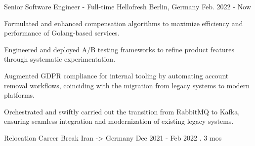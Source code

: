


\begin{cventries}


    \cventry
    {Senior Software Engineer - Full-time} %
    {Hellofresh} %
    {Berlin, Germany} %
    {Feb. 2022 - Now} %
    { %
        \begin{cvitems}
            \item {Formulated and enhanced compensation algorithms to maximize efficiency and performance of Golang-based services.}
            \item {Engineered and deployed A/B testing frameworks to refine product features through systematic experimentation.}
            \item {Augmented GDPR compliance for internal tooling by automating account removal workflows, coinciding with the migration from legacy systems to modern platforms.}
            \item {Orchestrated and swiftly carried out the transition from RabbitMQ to Kafka, ensuring seamless integration and modernization of existing legacy systems.}
        \end{cvitems}
    }


    \cventry
    {Relocation}
    {Career Break}
    {Iran -> Germany}
    {Dec 2021 - Feb 2022 . 3 mos}
    {}



\end{cventries}
